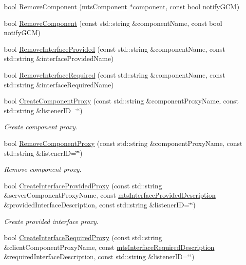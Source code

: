 \begin{DoxyCompactItemize}
\item 
bool \hyperlink{classmts_manager_local_a4cb535c191d77f663bfa38f92a37948f}{Remove\-Component} (\hyperlink{classmts_component}{mts\-Component} $\ast$component, const bool notify\-G\-C\-M)
\item 
bool \hyperlink{classmts_manager_local_a1bab522b229e093d0b4e61c7e7a5e31c}{Remove\-Component} (const std\-::string \&component\-Name, const bool notify\-G\-C\-M)
\item 
bool \hyperlink{classmts_manager_local_a81d9c51989fc1e062fbc0796fc358864}{Remove\-Interface\-Provided} (const std\-::string \&component\-Name, const std\-::string \&interface\-Provided\-Name)
\item 
bool \hyperlink{classmts_manager_local_ad6a62f29de1bef4a01611a2ddd566fa5}{Remove\-Interface\-Required} (const std\-::string \&component\-Name, const std\-::string \&interface\-Required\-Name)
\item 
bool \hyperlink{classmts_manager_local_a200bc8fea319014d8902724564d94481}{Create\-Component\-Proxy} (const std\-::string \&component\-Proxy\-Name, const std\-::string \&listener\-I\-D=\char`\"{}\char`\"{})
\begin{DoxyCompactList}\small\item\em Create component proxy. \end{DoxyCompactList}\item 
bool \hyperlink{classmts_manager_local_ac323b42bdf8078864f78a572625b05e6}{Remove\-Component\-Proxy} (const std\-::string \&component\-Proxy\-Name, const std\-::string \&listener\-I\-D=\char`\"{}\char`\"{})
\begin{DoxyCompactList}\small\item\em Remove component proxy. \end{DoxyCompactList}\item 
bool \hyperlink{classmts_manager_local_a196c71a8ad2532559e6744710954b5aa}{Create\-Interface\-Provided\-Proxy} (const std\-::string \&server\-Component\-Proxy\-Name, const \hyperlink{classmts_interface_provided_description}{mts\-Interface\-Provided\-Description} \&provided\-Interface\-Description, const std\-::string \&listener\-I\-D=\char`\"{}\char`\"{})
\begin{DoxyCompactList}\small\item\em Create provided interface proxy. \end{DoxyCompactList}\item 
bool \hyperlink{classmts_manager_local_a5229948aa578826b68cd5fc0e2ad287e}{Create\-Interface\-Required\-Proxy} (const std\-::string \&client\-Component\-Proxy\-Name, const \hyperlink{classmts_interface_required_description}{mts\-Interface\-Required\-Description} \&required\-Interface\-Description, const std\-::string \&listener\-I\-D=\char`\"{}\char`\"{})

\end{DoxyCompactItemize}
